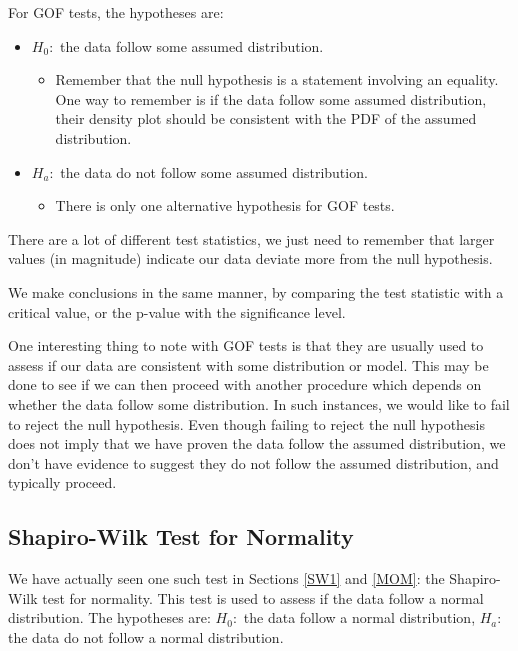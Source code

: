 \documentclass[
]{book}
\providecommand{\tightlist}{%
  \setlength{\itemsep}{0pt}\setlength{\parskip}{0pt}}
\begin{document}
For GOF tests, the hypotheses are:

\begin{itemize}
\tightlist
\item
  \(H_0:\) the data follow some assumed distribution.

  \begin{itemize}
  \tightlist
  \item
    Remember that the null hypothesis is a statement involving an equality. One way to remember is if the data follow some assumed distribution, their density plot should be consistent with the PDF of the assumed distribution.
  \end{itemize}
\item
  \(H_a:\) the data do not follow some assumed distribution.

  \begin{itemize}
  \tightlist
  \item
    There is only one alternative hypothesis for GOF tests.
  \end{itemize}
\end{itemize}

There are a lot of different test statistics, we just need to remember that larger values (in magnitude) indicate our data deviate more from the null hypothesis.

We make conclusions in the same manner, by comparing the test statistic with a critical value, or the p-value with the significance level.

One interesting thing to note with GOF tests is that they are usually used to assess if our data are consistent with some distribution or model. This may be done to see if we can then proceed with another procedure which depends on whether the data follow some distribution. In such instances, we would like to fail to reject the null hypothesis. Even though failing to reject the null hypothesis does not imply that we have proven the data follow the assumed distribution, we don't have evidence to suggest they do not follow the assumed distribution, and typically proceed.

\subsection{Shapiro-Wilk Test for Normality}\label{shapiro-wilk-test-for-normality}

We have actually seen one such test in Sections \ref{SW1} and \ref{MOM}: the Shapiro-Wilk test for normality. This test is used to assess if the data follow a normal distribution. The hypotheses are: \(H_0:\) the data follow a normal distribution, \(H_a:\) the data do not follow a normal distribution.
\end{document}
